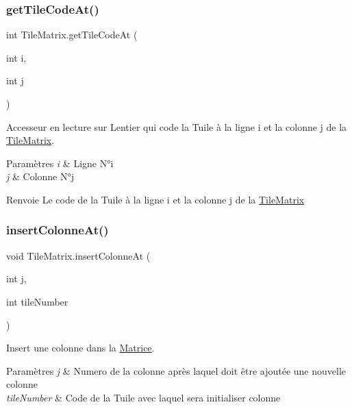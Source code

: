 \subsubsection{\texorpdfstring{get\+Tile\+Code\+At()}{getTileCodeAt()}}
{\footnotesize\ttfamily int Tile\+Matrix.\+get\+Tile\+Code\+At (\begin{DoxyParamCaption}\item[{int}]{i,  }\item[{int}]{j }\end{DoxyParamCaption})}



Accesseur en lecture sur L\textquotesingle{}entier qui code la Tuile à la ligne i et la colonne j de la \hyperlink{class_tile_matrix}{Tile\+Matrix}. 


\begin{DoxyParams}{Paramètres}
{\em i} & Ligne N°i \\
\hline
{\em j} & Colonne N°j \\
\hline
\end{DoxyParams}
\begin{DoxyReturn}{Renvoie}
Le code de la Tuile à la ligne i et la colonne j de la \hyperlink{class_tile_matrix}{Tile\+Matrix} 
\end{DoxyReturn}
\mbox{\label{class_tile_matrix_a0726b04506143b1710bb87b4565d9738}} 
\subsubsection{\texorpdfstring{insert\+Colonne\+At()}{insertColonneAt()}}
{\footnotesize\ttfamily void Tile\+Matrix.\+insert\+Colonne\+At (\begin{DoxyParamCaption}\item[{int}]{j,  }\item[{int}]{tile\+Number }\end{DoxyParamCaption})}



Insert une colonne dans la \hyperlink{class_matrice}{Matrice}. 


\begin{DoxyParams}{Paramètres}
{\em j} & Numero de la colonne après laquel doit être ajoutée une nouvelle colonne \\
\hline
{\em tile\+Number} & Code de la Tuile avec laquel sera initialiser colonne \\
\hline
\end{DoxyParams}
\mbox{\label{class_tile_matrix_ad3dc00ccf107bf42068ed0dc2be5bc3b}} 
